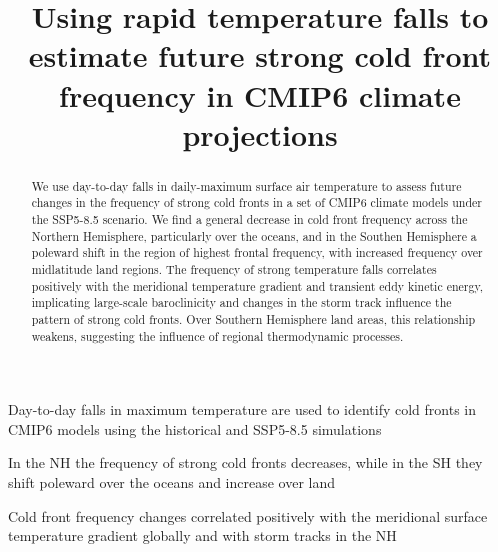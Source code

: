 \documentclass[
]{agujournal2019}
\begin{document}
\title{Using rapid temperature falls to estimate future strong cold
front frequency in CMIP6 climate projections}


\begin{keypoints}
\item Day-to-day falls in maximum temperature are used to identify cold
fronts in CMIP6 models using the historical and SSP5-8.5
simulations \item In the NH the frequency of strong cold fronts
decreases, while in the SH they shift poleward over the oceans and
increase over land \item Cold front frequency changes correlated
positively with the meridional surface temperature gradient globally and
with storm tracks in the NH 
\end{keypoints}

\begin{abstract}
We use day-to-day falls in daily-maximum surface air temperature to
assess future changes in the frequency of strong cold fronts in a set of
CMIP6 climate models under the SSP5-8.5 scenario. We find a general
decrease in cold front frequency across the Northern Hemisphere,
particularly over the oceans, and in the Southen Hemisphere a poleward
shift in the region of highest frontal frequency, with increased
frequency over midlatitude land regions. The frequency of strong
temperature falls correlates positively with the meridional temperature
gradient and transient eddy kinetic energy, implicating large-scale
baroclinicity and changes in the storm track influence the pattern of
strong cold fronts. Over Southern Hemisphere land areas, this
relationship weakens, suggesting the influence of regional thermodynamic
processes.
\end{abstract}
\end{document}
